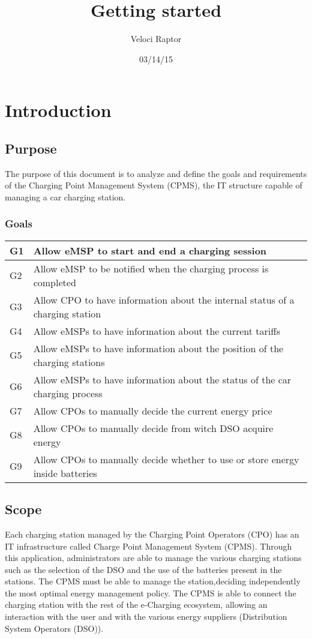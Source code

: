 \documentclass[12pt]{article}
\title{Getting started}
\author{Veloci Raptor}
\date{03/14/15}
\begin{document}
\maketitle

\chapter{Introduction}
\section{Purpose}
The purpose of this document is to analyze and define the goals and requirements of the Charging Point Management System (CPMS), the IT structure capable of managing a car charging station.
\subsection{Goals}
\begin{tabular}{ |l|l| } 
\hline 
G1 & Allow eMSP to start and end a charging session\\
 \hline 
G2 & Allow eMSP to be notified when the charging process is completed\\
 \hline
G3 & Allow CPO to have information about the internal status of a charging station\\
 \hline
G4 & Allow eMSPs to have information about the current tariffs\\
 \hline
G5 & Allow eMSPs to have information about the position of the charging stations\\
 \hline
G6 & Allow eMSPs to have information about the status of the car charging process \\
 \hline
G7 & Allow CPOs to manually decide the current energy price \\
\hline
G8 & Allow CPOs to manually decide from witch DSO acquire energy \\
 \hline
G9 & Allow CPOs to manually decide whether to use or store energy inside batteries \\
\hline
\end{tabular}

\section{Scope}
Each charging station managed by the Charging Point Operators (CPO) has an IT infrastructure called Charge Point Management System (CPMS). Through this application, administrators are able to manage the various charging stations such as the selection of the DSO and the use of the batteries present in the stations. The CPMS must be able to manage the station,deciding independently the most optimal energy management policy. The CPMS is able to connect the charging station with the rest of the e-Charging ecosystem, allowing an interaction with the user and with the various energy suppliers (Distribution System Operators (DSO)).\\
\end{document}

